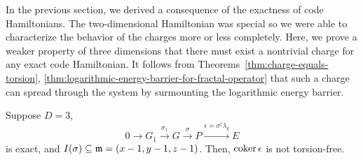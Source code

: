 In the previous section, we derived a consequence of the exactness of code Hamiltonians.
The two-dimensional Hamiltonian was special 
so we were able to characterize the behavior of the charges more or less completely.
Here, we prove a weaker property of three dimensions that there must exist a nontrivial charge
for any exact code Hamiltonian.
It follows from Theorems~\ref{thm:charge-equals-torsion},%
\ref{thm:logarithmic-energy-barrier-for-fractal-operator}
that such a charge can spread through the system
by surmounting the logarithmic energy barrier.
\begin{lem}
Suppose $D=3$,
\[
  0 \to G_1 \xrightarrow{\sigma_1} G \xrightarrow{\sigma} P \xrightarrow{\epsilon=\sigma^\dagger \lambda_q} E
\]
is exact, and $I(\sigma) \subseteq \mathfrak{m} = (x-1,y-1,z-1)$.
Then, $\mathop{\mathrm{coker}}\nolimits \epsilon$ is not torsion-free.
\label{lem:char-ideal-with-support-on-origin-implies-fractal}
\end{lem}
